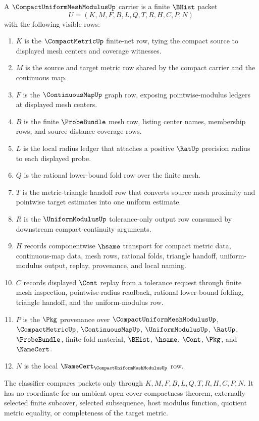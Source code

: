 \begin{definition}
\label{def:compact-uniform-mesh-modulus-carrier}
A $\CompactUniformMeshModulusUp$ carrier is a finite $\BHist$ packet
$$
U=(K,M,F,B,L,Q,T,R,H,C,P,N)
$$
with the following visible rows:
\begin{enumerate}
\item $K$ is the $\CompactMetricUp$ finite-net row, tying the compact source to displayed mesh centers and coverage witnesses.
\item $M$ is the source and target metric row shared by the compact carrier and the continuous map.
\item $F$ is the $\ContinuousMapUp$ graph row, exposing pointwise-modulus ledgers at displayed mesh centers.
\item $B$ is the finite $\ProbeBundle$ mesh row, listing center names, membership rows, and source-distance coverage rows.
\item $L$ is the local radius ledger that attaches a positive $\RatUp$ precision radius to each displayed probe.
\item $Q$ is the rational lower-bound fold row over the finite mesh.
\item $T$ is the metric-triangle handoff row that converts source mesh proximity and pointwise target estimates into one uniform estimate.
\item $R$ is the $\UniformModulusUp$ tolerance-only output row consumed by downstream compact-continuity arguments.
\item $H$ records componentwise $\hsame$ transport for compact metric data, continuous-map data, mesh rows, rational folds, triangle handoff, uniform-modulus output, replay, provenance, and local naming.
\item $C$ records displayed $\Cont$ replay from a tolerance request through finite mesh inspection, pointwise-radius readback, rational lower-bound folding, triangle handoff, and the uniform-modulus row.
\item $P$ is the $\Pkg$ provenance over $\CompactUniformMeshModulusUp$, $\CompactMetricUp$, $\ContinuousMapUp$, $\UniformModulusUp$, $\RatUp$, $\ProbeBundle$, finite-fold material, $\BHist$, $\hsame$, $\Cont$, $\Pkg$, and $\NameCert$.
\item $N$ is the local $\NameCert_{\CompactUniformMeshModulusUp}$ row.
\end{enumerate}
The classifier compares packets only through $K,M,F,B,L,Q,T,R,H,C,P,N$. It has no coordinate for an ambient open-cover compactness theorem, externally selected finite subcover, selected subsequence, host modulus function, quotient metric equality, or completeness of the target metric.
\end{definition}

